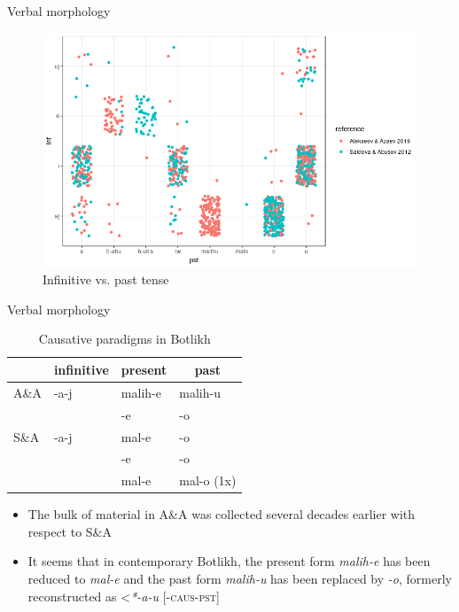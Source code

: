 \begin{frame}{Verbal morphology}

\begin{figure}[h]
\centering
\caption{Infinitive vs. past tense}
\includegraphics[scale=0.45]{images/infxpst.png}
\end{figure}

\end{frame}


\begin{frame}{Verbal morphology}

\begin{table}[h]
\caption{Causative paradigms in Botlikh}
\label{tab:caus}
\begin{tabular}{l|l|l|l}
     & \multicolumn{1}{c|}{infinitive} & \multicolumn{1}{c|}{present} & \multicolumn{1}{c}{past} \\ \hline
A\&A & -a-j                            & malih-e                      & malih-u                  \\
     &                                 & -e                           & -o                       \\ \hline
S\&A & -a-j                            & mal-e                        & -o                       \\
     &                                 & -e                           & -o                       \\
     &                                 & mal-e                        & mal-o (1x)                  
\end{tabular}
\end{table}

\pause

\begin{itemize}
    \item The bulk of material in A\&A was collected several decades earlier with respect to S\&A
    \item It seems that in contemporary Botlikh, the present form \textit{malih-e} has been reduced to \textit{mal-e} and the past form \textit{malih-u} has been replaced by \textit{-o}, formerly reconstructed as \textless \textit{*-a-u} [\textsc{-caus-pst}]
\end{itemize}
\end{frame}


